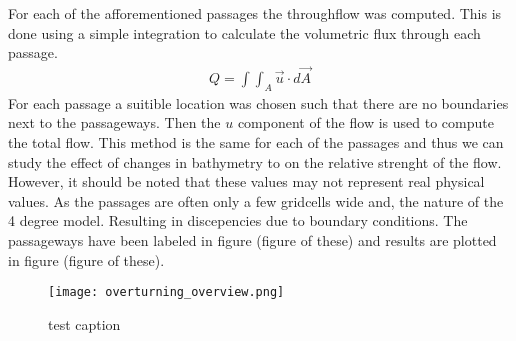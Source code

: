 For each of the afforementioned passages the throughflow was computed. This is done using a simple integration to calculate the volumetric flux through each passage.
\begin{align}
	Q = \int \int_A \vec{u} \cdot d\vec{A}
\end{align}	
For each passage a suitible location was chosen such that there are no boundaries next to the passageways. Then the $u$ component of the flow is used to compute the total flow. This method is the same for each of the passages and thus we can study the effect of changes in bathymetry to on the relative strenght of the flow. However, it should be noted that these values may not represent real physical values. As the passages are often only a few gridcells wide and, the nature of the 4 degree model. Resulting in discepencies due to boundary conditions. The passageways have been labeled in figure (figure of these) and results are plotted in figure (figure of these).

\begin{figure}[H]
	\texttt{[image: overturning\_overview.png]}
	\caption{test caption}
	\label{fig:example1}
\end{figure}